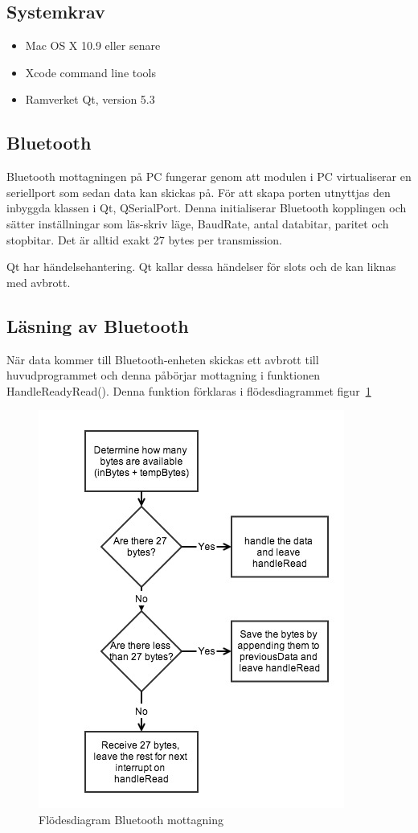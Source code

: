 \documentclass[a4paper,12pt,fleqn]{article}
\begin{document}
\subsection{Systemkrav}
\begin{itemize}
	\item Mac OS X 10.9 eller senare
	\item Xcode command line tools
	\item Ramverket Qt, version 5.3
\end{itemize}

\subsection{Bluetooth}
Bluetooth mottagningen på PC fungerar genom att modulen i PC virtualiserar en seriellport som sedan data kan skickas på. För att skapa porten utnyttjas den inbyggda klassen i Qt, QSerialPort. Denna initialiserar Bluetooth kopplingen och sätter inställningar som läs-skriv läge, BaudRate, antal databitar, paritet och stopbitar. Det är alltid exakt 27 bytes per transmission. 

Qt har händelsehantering. Qt kallar dessa händelser för slots och de kan liknas med avbrott.

\subsection{Läsning av Bluetooth}
När data kommer till Bluetooth-enheten skickas ett avbrott till huvudprogrammet och denna påbörjar mottagning i funktionen HandleReadyRead(). Denna funktion förklaras i flödesdiagrammet figur~\ref{fig:BTpc}

\begin{figure}[htp] %
  \begin{center}
  \includegraphics[keepaspectratio=true,width=0.6\linewidth]{bilder/bluetoothpc.jpg}  %
  \end{center}
  \caption{Flödesdiagram Bluetooth mottagning} %
  \label{fig:BTpc}
\end{figure}
\end{document}
